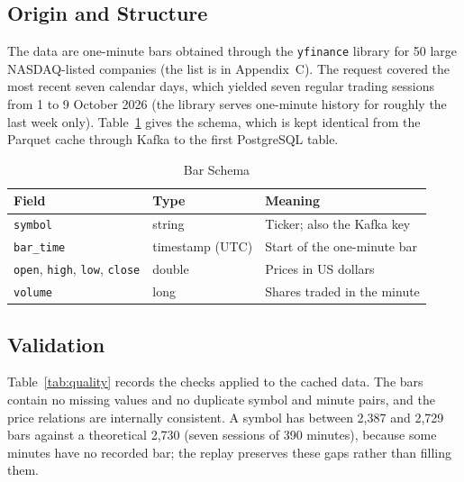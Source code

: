 \documentclass[conference]{IEEEtran}
\newcommand{\code}[1]{\texttt{#1}}
\begin{document}
\subsection{Origin and Structure}
The data are one-minute bars obtained through the \code{yfinance} library \cite{yfinance} for 50 large NASDAQ-listed companies (the list is in Appendix~C). The request covered the most recent seven calendar days, which yielded seven regular trading sessions from 1 to 9 October 2026 (the library serves one-minute history for roughly the last week only). Table~\ref{tab:schema} gives the schema, which is kept identical from the Parquet cache through Kafka to the first PostgreSQL table.

\begin{table}[t]
\caption{Bar Schema}
\label{tab:schema}
\centering
\small
\begin{tabular}{@{}p{2.55cm}p{1.9cm}p{3.5cm}@{}}
\toprule
Field & Type & Meaning \\
\midrule
\code{symbol} & string & Ticker; also the Kafka key \\
\code{bar\_time} & timestamp (UTC) & Start of the one-minute bar \\
\code{open}, \code{high}, \code{low}, \code{close} & double & Prices in US dollars \\
\code{volume} & long & Shares traded in the minute \\
\bottomrule
\end{tabular}
\end{table}

\subsection{Validation}
Table~\ref{tab:quality} records the checks applied to the cached data. The bars contain no missing values and no duplicate symbol and minute pairs, and the price relations are internally consistent. A symbol has between 2,387 and 2,729 bars against a theoretical 2,730 (seven sessions of 390 minutes), because some minutes have no recorded bar; the replay preserves these gaps rather than filling them.
\end{document}
